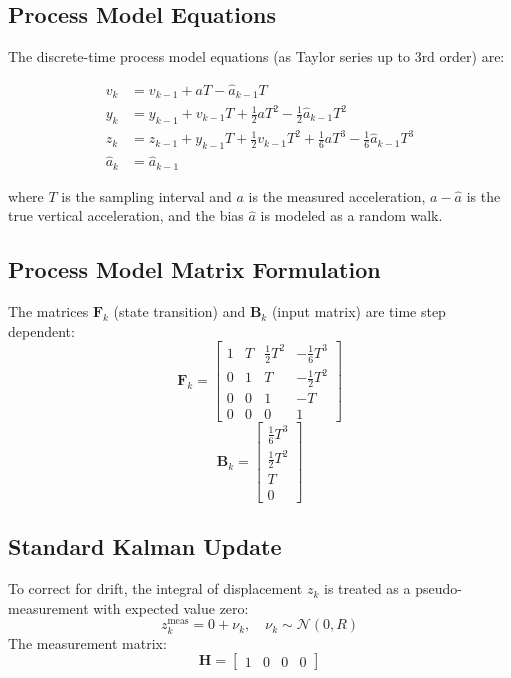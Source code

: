 \documentclass[11pt,letterpaper]{article}
\begin{document}
\subsection*{Process Model Equations}
The discrete-time process model equations (as Taylor series up to 3rd order) are:

\begin{align}
v_k &= v_{k-1} + a T - \hat{a}_{k-1} T \\
y_k &= y_{k-1} + v_{k-1} T + \frac{1}{2}a T^2 - \frac{1}{2}\hat{a}_{k-1} T^2 \\
z_k &= z_{k-1} + y_{k-1} T + \frac{1}{2}v_{k-1} T^2 + \frac{1}{6}a T^3 - \frac{1}{6}\hat{a}_{k-1} T^3 \\
\hat{a}_k &= \hat{a}_{k-1}
\end{align}

where $T$ is the sampling interval and $a$ is the measured acceleration, $a - \hat{a}$ is the true vertical acceleration, and the bias $\hat{a}$ is modeled as a random walk.

\subsection*{Process Model Matrix Formulation}
The matrices \( \mathbf{F}_k \) (state transition) and \( \mathbf{B}_k \) (input matrix) are time step dependent:
\begin{equation}
\mathbf{F}_k =
\begin{bmatrix}
1 & T & \frac{1}{2}T^2 & -\frac{1}{6}T^3 \\
0 & 1 & T & -\frac{1}{2}T^2 \\
0 & 0 & 1 & -T \\
0 & 0 & 0 & 1
\end{bmatrix}
\end{equation}
\begin{equation}
\mathbf{B}_k =
\begin{bmatrix}
\frac{1}{6}T^3 \\
\frac{1}{2}T^2 \\
T \\
0
\end{bmatrix}
\end{equation}

\subsection*{Standard Kalman Update}
To correct for drift, the integral of displacement \( z_k \) is treated as a pseudo-measurement with expected value zero:
\begin{equation}
z_k^\text{meas} = 0 + \nu_k, \quad \nu_k \sim \mathcal{N}(0, R)
\end{equation}
The measurement matrix:
\begin{equation}
\mathbf{H} = \begin{bmatrix} 1 & 0 & 0 & 0 \end{bmatrix}
\end{equation}
\end{document}
